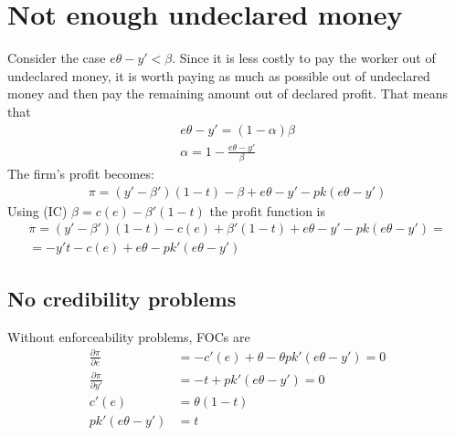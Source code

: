 \documentclass[a4paper]{article}
\begin{document}
\section{Not enough undeclared money}
Consider the case $e\theta - y' < \beta$. Since it is less costly to pay the worker out of undeclared money, it is worth paying as much as possible out of undeclared money and then pay the remaining amount out of declared profit. That means that 
\begin{align*}
e\theta - y' = (1 - \alpha) \beta\\
\alpha = 1 - \frac{e \theta - y'}{\beta}
\end{align*}
The firm's profit becomes:
\begin{align*}
\pi = (y' - \beta')(1 - t) - \beta + e \theta - y' - pk(e \theta - y')
\end{align*}
Using (IC) $\beta = c(e) - \beta'(1-t)$ the profit function is
\begin{align*}
\pi = (y'-\beta')(1-t) - c(e) + \beta' (1-t) +e \theta -y' -pk(e \theta - y') = \\ =-y't - c(e) + e \theta -pk'(e \theta - y')
\end{align*}
\subsection{No credibility problems}
Without enforceability problems, FOCs are
\begin{align*}
\frac{\partial \pi }{\partial e} &= -c'(e) + \theta - \theta p k'(e\theta - y') = 0\\
\frac{\partial \pi}{\partial y'} &= -t + pk'(e \theta - y') = 0\\
c'(e) &= \theta(1-t)\\
pk'(e \theta -y') &= t
\end{align*}
\end{document}
